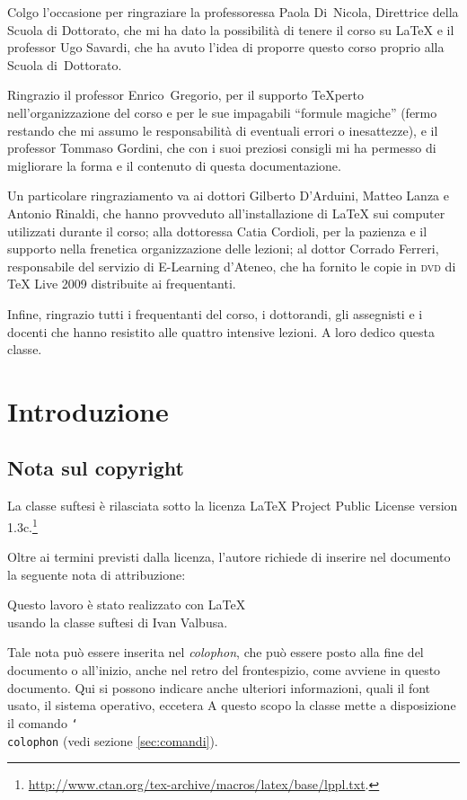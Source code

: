 \documentclass{suftesi}
\DeclareRobustCommand*{\cs}[1]{\texttt{\char`\\#1}}
\def\suftesi{\textsf{suftesi}}
\begin{document}
Colgo l’occasione per ringraziare la professoressa Paola Di~Nicola,
Direttrice della Scuola di Dottorato, che mi ha dato la possibilità di tenere il
corso su \LaTeX{} e il professor Ugo Savardi, che ha avuto l'idea di
proporre questo corso proprio alla Scuola di~Dottorato.

Ringrazio il
professor Enrico~Gregorio, per il supporto \TeX perto
nell'organizzazione del corso e per le sue impagabili ``formule magiche'' (fermo restando che mi assumo le responsabilità di eventuali errori o inesattezze), e il professor Tommaso Gordini, che con i suoi preziosi consigli mi ha permesso di migliorare la forma e il contenuto di questa documentazione.

Un particolare ringraziamento va ai dottori Gilberto D'Arduini, Matteo Lanza e Antonio Rinaldi, che hanno provveduto all'installazione di \LaTeX{} sui computer utilizzati durante il corso; alla dottoressa Catia Cordioli, per la pazienza e il supporto nella frenetica organizzazione delle lezioni; al dottor Corrado Ferreri, responsabile del servizio di \mbox{E-Learning} d'Ateneo, che ha fornito le copie in \textsc{dvd} di TeX Live 2009 distribuite ai frequentanti.

Infine, ringrazio tutti i frequentanti del corso, i
dottorandi, gli assegnisti e i docenti che hanno resistito alle quattro intensive lezioni. A loro dedico questa classe.

\chapter{Introduzione}

\section*{Nota sul copyright}

La classe \suftesi{} è rilasciata sotto la licenza LaTeX Project Public License  version 1.3c.\footnote{\url{http://www.ctan.org/tex-archive/macros/latex/base/lppl.txt}.}

Oltre ai termini previsti dalla licenza, l'autore richiede di inserire nel documento la seguente nota di attribuzione:
\begin{center}
Questo lavoro è stato realizzato con \LaTeX{}\\ usando la classe \suftesi{} di Ivan Valbusa.
\end{center}
Tale nota  può essere inserita nel \emph{colophon}, che può essere posto alla fine del documento o all'inizio, anche nel retro del frontespizio, come avviene in questo documento. Qui si possono indicare anche ulteriori informazioni, quali il font usato, il sistema operativo, eccetera A questo scopo la classe mette a disposizione il comando \cs{colophon} (vedi sezione \ref{sec:comandi}).  
\end{document}
